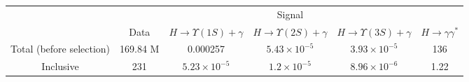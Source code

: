 

\begin{tabular}{c|c|c|c|c|c}
\hline
\hline

&  &  \multicolumn{3}{c|}{Signal} &    \\
\cline{3-5}
& Data & $H \rightarrow \Upsilon(1S)+\gamma$ & $H \rightarrow \Upsilon(2S)+\gamma$ & $H \rightarrow \Upsilon(3S)+\gamma$ &  $H \rightarrow \gamma\gamma^{*}$  \\
\hline
Total (before selection) & 169.84 M &  0.000257 & $5.43 \times 10^{-5}$ & $3.93 \times 10^{-5}$ & 136  \\
\hline\hline
Inclusive & 231  &  $5.23 \times 10^{-5}$ &  $1.2 \times 10^{-5}$ &  $8.96 \times 10^{-6}$ &  1.22  \\

\end{tabular}


